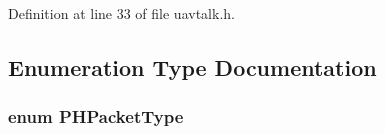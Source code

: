 Definition at line 33 of file uavtalk.\-h.



\subsection{Enumeration Type Documentation}
\hypertarget{group___open_pilot_libraries_gafc6fe85f3c89dabc11ae43c825fb28ad}{
\subsubsection[{P\-H\-Packet\-Type}]{\setlength{\rightskip}{0pt plus 5cm}enum {\bf P\-H\-Packet\-Type}}}\label{group___open_pilot_libraries_gafc6fe85f3c89dabc11ae43c825fb28ad}
